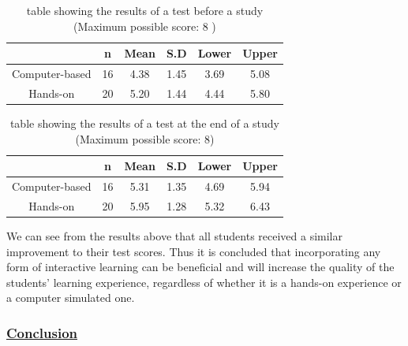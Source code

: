 \documentclass[../main.tex]{subfiles}
\begin{document}
\begin{table}[h!]
    \caption{table showing the results of a test before a study (Maximum possible score: 8 )}  
    \centering
    \begin{tabular}{|c|c|c|c|c|c|}
       \hline
         & n & Mean & S.D & Lower & Upper \\
       \hline
       Computer-based & 16 & 4.38 & 1.45 & 3.69 & 5.08 \\
      \hline
       Hands-on & 20 & 5.20 & 1.44 & 4.44 & 5.80 \\
       \hline
       \end{tabular}
    \label{tab:1}
\end{table}
\begin{table}[!ht]
    \caption{ table showing the results of a test at the end of a study (Maximum possible score: 8)}  
    \centering
    \begin{tabular}{|c|c|c|c|c|c|}
       \hline
         & n & Mean & S.D & Lower & Upper \\
       \hline
       Computer-based & 16 & 5.31 & 1.35 & 4.69 & 5.94 \\
      \hline
       Hands-on & 20 & 5.95 & 1.28 & 5.32 & 6.43 \\
       \hline
       \end{tabular}
    \label{tab:2}
\end{table}

We can see from the results above that all students received a similar improvement to their test scores. Thus it is concluded that incorporating any form of interactive learning can be beneficial and will increase the quality of the students’ learning experience, regardless of whether it is a hands-on experience or a computer simulated one.

\subsubsection*{\underline{Conclusion}}
\end{document}
